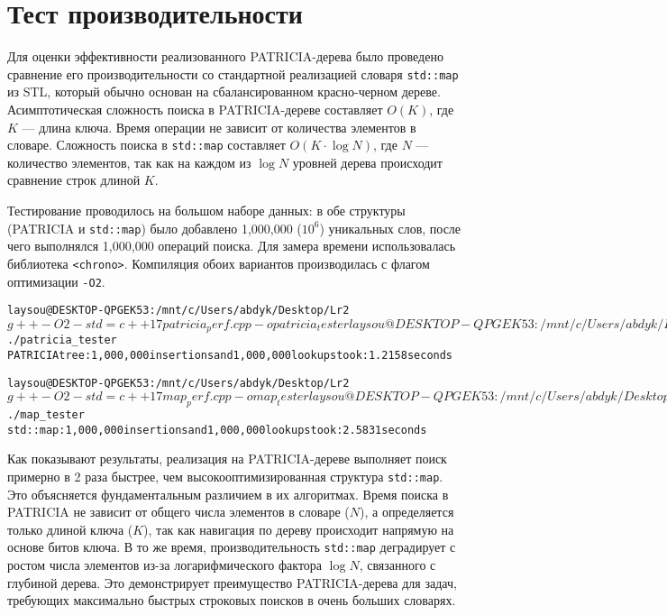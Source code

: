 \section{Тест производительности}

Для оценки эффективности реализованного PATRICIA-дерева было проведено сравнение его производительности со стандартной реализацией словаря \texttt{std::map} из STL, который обычно основан на сбалансированном красно-черном дереве. Асимптотическая сложность поиска в PATRICIA-дереве составляет $O(K)$, где $K$ — длина ключа. Время операции не зависит от количества элементов в словаре. Сложность поиска в \texttt{std::map} составляет $O(K \cdot \log N)$, где $N$ — количество элементов, так как на каждом из $\log N$ уровней дерева происходит сравнение строк длиной $K$.

Тестирование проводилось на большом наборе данных: в обе структуры (PATRICIA и \texttt{std::map}) было добавлено 1,000,000 ($10^6$) уникальных слов, после чего выполнялся 1,000,000 операций поиска. Для замера времени использовалась библиотека \texttt{<chrono>}. Компиляция обоих вариантов производилась с флагом оптимизации \texttt{-O2}.
\begin{alltt}
\selectfont
laysou@DESKTOP-QPGEK53:/mnt/c/Users/abdyk/Desktop/Lr2$ g++ -O2 -std=c++17 patricia_perf.cpp -o patricia_tester
laysou@DESKTOP-QPGEK53:/mnt/c/Users/abdyk/Desktop/Lr2$ ./patricia_tester
PATRICIA tree: 1,000,000 insertions and 1,000,000 lookups took: 1.2158 seconds

laysou@DESKTOP-QPGEK53:/mnt/c/Users/abdyk/Desktop/Lr2$ g++ -O2 -std=c++17 map_perf.cpp -o map_tester
laysou@DESKTOP-QPGEK53:/mnt/c/Users/abdyk/Desktop/Lr2$ ./map_tester
std::map: 1,000,000 insertions and 1,000,000 lookups took: 2.5831 seconds
\end{alltt}

Как показывают результаты, реализация на PATRICIA-дереве выполняет поиск примерно в 2 раза быстрее, чем высокооптимизированная структура \texttt{std::map}. Это объясняется фундаментальным различием в их алгоритмах. Время поиска в PATRICIA не зависит от общего числа элементов в словаре ($N$), а определяется только длиной ключа ($K$), так как навигация по дереву происходит напрямую на основе битов ключа. В то же время, производительность \texttt{std::map} деградирует с ростом числа элементов из-за логарифмического фактора $\log N$, связанного с глубиной дерева. Это демонстрирует преимущество PATRICIA-дерева для задач, требующих максимально быстрых строковых поисков в очень больших словарях.

